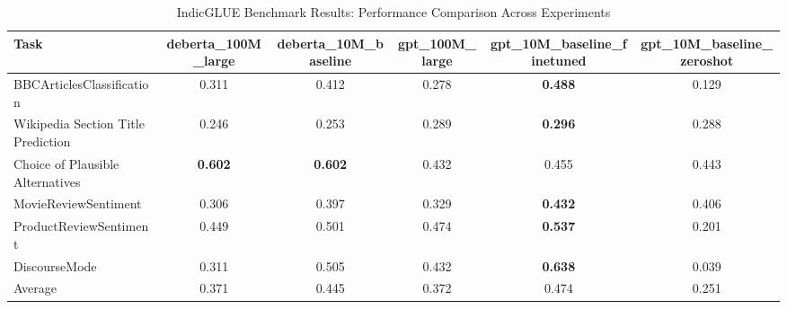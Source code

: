 \begin{table}[htbp]
\centering
\caption{IndicGLUE Benchmark Results: Performance Comparison Across Experiments}
\label{tab:indicglue_results}
\begin{tabular}{lccccc}
\toprule
Task & deberta_100M_large & deberta_10M_baseline & gpt_100M_large & gpt_10M_baseline_finetuned & gpt_10M_baseline_zeroshot \\
\midrule
BBCArticlesClassification & 0.311 & 0.412 & 0.278 & \textbf{0.488} & 0.129 \\
Wikipedia Section Title Prediction & 0.246 & 0.253 & 0.289 & \textbf{0.296} & 0.288 \\
Choice of Plausible Alternatives & \textbf{0.602} & \textbf{0.602} & 0.432 & 0.455 & 0.443 \\
MovieReviewSentiment & 0.306 & 0.397 & 0.329 & \textbf{0.432} & 0.406 \\
ProductReviewSentiment & 0.449 & 0.501 & 0.474 & \textbf{0.537} & 0.201 \\
DiscourseMode & 0.311 & 0.505 & 0.432 & \textbf{0.638} & 0.039 \\
\midrule
Average & 0.371 & 0.445 & 0.372 & 0.474 & 0.251 \\
\bottomrule
\end{tabular}
\end{table}
